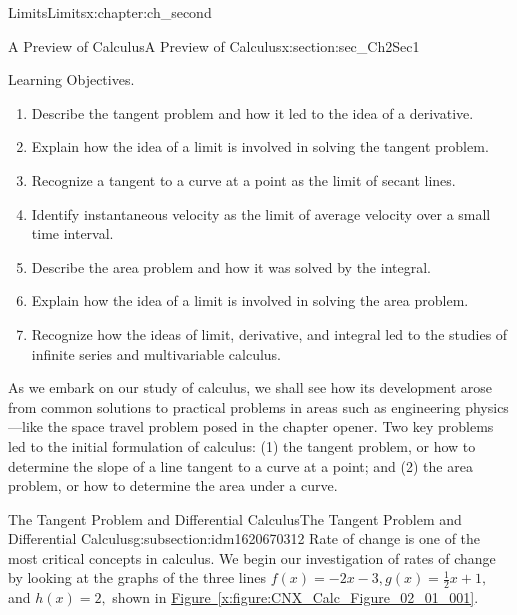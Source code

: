 \documentclass[oneside,10pt,]{book}
\newcommand{\xreffont}{\relax}
\numberwithin{equation}{section}
\begin{document}
%
%
\typeout{************************************************}
\typeout{************************************************}
%
\begin{chapterptx}{Limits}{}{Limits}{}{}{x:chapter:ch_second}
%
%
\typeout{************************************************}
\typeout{************************************************}
%
\begin{sectionptx}{A Preview of Calculus}{}{A Preview of Calculus}{}{}{x:section:sec_Ch2Sec1}
\begin{introduction}{Learning Objectives.}%
%
\begin{enumerate}
\item{}Describe the tangent problem and how it led to the idea of a derivative.%
\item{}Explain how the idea of a limit is involved in solving the tangent problem.%
\item{}Recognize a tangent to a curve at a point as the limit of secant lines.%
\item{}Identify instantaneous velocity as the limit of average velocity over a small time interval.%
\item{}Describe the area problem and how it was solved by the integral.%
\item{}Explain how the idea of a limit is involved in solving the area problem.%
\item{}Recognize how the ideas of limit, derivative, and integral led to the studies of infinite series and multivariable calculus.%
\end{enumerate}
As we embark on our study of calculus, we shall see how its development arose from common solutions to practical problems in areas such as engineering physics—like the space travel problem posed in the chapter opener. Two key problems led to the initial formulation of calculus: (1) the tangent problem, or how to determine the slope of a line tangent to a curve at a point; and (2) the area problem, or how to determine the area under a curve.%
\end{introduction}%
%
%
\typeout{************************************************}
\typeout{************************************************}
%
\begin{subsectionptx}{The Tangent Problem and Differential Calculus}{}{The Tangent Problem and Differential Calculus}{}{}{g:subsection:idm1620670312}
Rate of change is one of the most critical concepts in calculus. We begin our investigation of rates of change by looking at the graphs of the three lines \(f(x)=-2x-3,g(x)=\frac{1}{2}x+1,\) and \(h(x)=2,\) shown in \hyperref[x:figure:CNX_Calc_Figure_02_01_001]{Figure~{\xreffont\ref{x:figure:CNX_Calc_Figure_02_01_001}}}.%

\end{subsectionptx}
\end{sectionptx}
\end{chapterptx}
\end{document}
